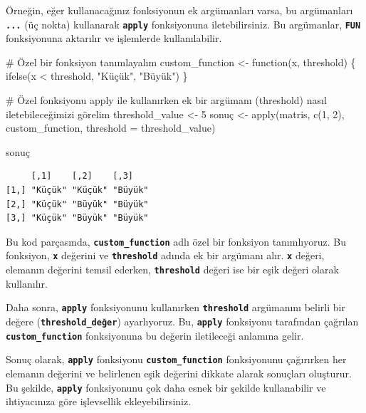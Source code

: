 \documentclass[
  letterpaper,
  DIV=11,
  numbers=noendperiod]{scrreprt}
\newenvironment{Shaded}{\begin{snugshade}}{\end{snugshade}}
\newcommand{\AttributeTok}[1]{\textcolor[rgb]{0.40,0.45,0.13}{#1}}
\newcommand{\CommentTok}[1]{\textcolor[rgb]{0.37,0.37,0.37}{#1}}
\newcommand{\ControlFlowTok}[1]{\textcolor[rgb]{0.00,0.23,0.31}{#1}}
\newcommand{\DecValTok}[1]{\textcolor[rgb]{0.68,0.00,0.00}{#1}}
\newcommand{\FunctionTok}[1]{\textcolor[rgb]{0.28,0.35,0.67}{#1}}
\newcommand{\NormalTok}[1]{\textcolor[rgb]{0.00,0.23,0.31}{#1}}
\newcommand{\OtherTok}[1]{\textcolor[rgb]{0.00,0.23,0.31}{#1}}
\newcommand{\SpecialCharTok}[1]{\textcolor[rgb]{0.37,0.37,0.37}{#1}}
\newcommand{\StringTok}[1]{\textcolor[rgb]{0.13,0.47,0.30}{#1}}
\begin{document}
Örneğin, eğer kullanacağınız fonksiyonun ek argümanları varsa, bu
argümanları \textbf{\texttt{...}} (üç nokta) kullanarak
\textbf{\texttt{apply}} fonksiyonuna iletebilirsiniz. Bu argümanlar,
\textbf{\texttt{FUN}} fonksiyonuna aktarılır ve işlemlerde
kullanılabilir.

\begin{Shaded}
\begin{Highlighting}[]
\CommentTok{\# Özel bir fonksiyon tanımlayalım}
\NormalTok{custom\_function }\OtherTok{\textless{}{-}} \ControlFlowTok{function}\NormalTok{(x, threshold) \{}
  \FunctionTok{ifelse}\NormalTok{(x }\SpecialCharTok{\textless{}}\NormalTok{ threshold, }\StringTok{"Küçük"}\NormalTok{, }\StringTok{"Büyük"}\NormalTok{)}
\NormalTok{\}}

\CommentTok{\# Özel fonksiyonu apply ile kullanırken ek bir argümanı (threshold) nasıl iletebileceğimizi görelim}
\NormalTok{threshold\_value }\OtherTok{\textless{}{-}} \DecValTok{5}
\NormalTok{sonuç }\OtherTok{\textless{}{-}} \FunctionTok{apply}\NormalTok{(matris, }\FunctionTok{c}\NormalTok{(}\DecValTok{1}\NormalTok{, }\DecValTok{2}\NormalTok{), custom\_function, }\AttributeTok{threshold =}\NormalTok{ threshold\_value)}

\NormalTok{sonuç}
\end{Highlighting}
\end{Shaded}

\begin{verbatim}
     [,1]    [,2]    [,3]   
[1,] "Küçük" "Küçük" "Büyük"
[2,] "Küçük" "Büyük" "Büyük"
[3,] "Küçük" "Büyük" "Büyük"
\end{verbatim}

Bu kod parçasında, \textbf{\texttt{custom\_function}} adlı özel bir
fonksiyon tanımlıyoruz. Bu fonksiyon, \textbf{\texttt{x}} değerini ve
\textbf{\texttt{threshold}} adında ek bir argümanı alır.
\textbf{\texttt{x}} değeri, elemanın değerini temsil ederken,
\textbf{\texttt{threshold}} değeri ise bir eşik değeri olarak
kullanılır.

Daha sonra, \textbf{\texttt{apply}} fonksiyonunu kullanırken
\textbf{\texttt{threshold}} argümanını belirli bir değere
(\textbf{\texttt{threshold\_değer}}) ayarlıyoruz. Bu,
\textbf{\texttt{apply}} fonksiyonu tarafından çağrılan
\textbf{\texttt{custom\_function}} fonksiyonuna bu değerin iletileceği
anlamına gelir.

Sonuç olarak, \textbf{\texttt{apply}} fonksiyonu
\textbf{\texttt{custom\_function}} fonksiyonunu çağırırken her elemanın
değerini ve belirlenen eşik değerini dikkate alarak sonuçları oluşturur.
Bu şekilde, \textbf{\texttt{apply}} fonksiyonunu çok daha esnek bir
şekilde kullanabilir ve ihtiyacınıza göre işlevsellik ekleyebilirsiniz.
\end{document}
